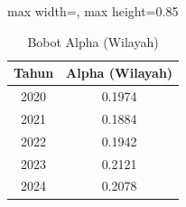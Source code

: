 \begin{table}[H]
\centering
\caption{Bobot Alpha (Wilayah)} \makeatletter{}\makeatother
\begin{adjustbox}{max width=\textwidth, max height=0.85\textheight}
\begin{tabular}{|c|c|}
\hline
\textbf{Tahun} & \textbf{Alpha (Wilayah)} \\
\hline
2020 & 0.1974 \\
2021 & 0.1884 \\
2022 & 0.1942 \\
2023 & 0.2121 \\
2024 & 0.2078 \\
\hline
\end{tabular}
\end{adjustbox}
\end{table}